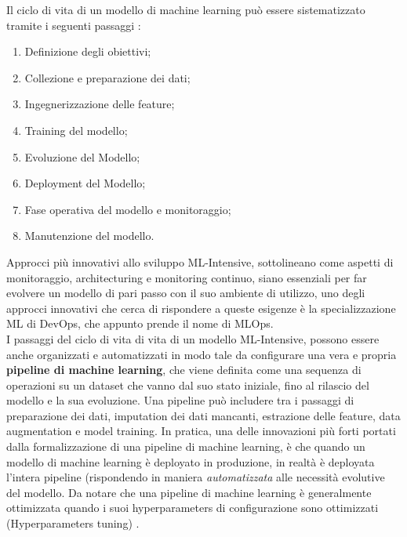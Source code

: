 Il ciclo di vita di un modello di machine learning può essere sistematizzato tramite i seguenti passaggi \cite{burkov2020machine}:

\begin{enumerate}
    \item Definizione degli obiettivi;
    \item Collezione e preparazione dei dati;
    \item Ingegnerizzazione delle feature;
    \item Training del modello;
    \item Evoluzione del Modello;
    \item Deployment del Modello;
    \item Fase operativa del modello e monitoraggio;
    \item Manutenzione del modello.
\end{enumerate}

Approcci più innovativi allo sviluppo ML-Intensive, sottolineano come aspetti di monitoraggio, architecturing e monitoring continuo, siano essenziali per far evolvere un modello di pari passo con il suo ambiente di utilizzo, uno degli approcci innovativi che cerca di rispondere a queste esigenze è la specializzazione ML di DevOps, che appunto prende il nome di MLOps.\\

I passaggi del ciclo di vita di vita di un modello ML-Intensive, possono essere anche organizzati e automatizzati in modo tale da configurare una vera e propria \textbf{pipeline di machine learning}, che viene definita come una sequenza di operazioni su un dataset che vanno dal suo stato iniziale, fino al rilascio del modello e la sua evoluzione. Una pipeline può includere tra i passaggi di preparazione dei dati, imputation dei dati mancanti, estrazione delle feature, data augmentation e model training\cite{burkov2020machine}. In pratica, una delle innovazioni più forti portati dalla formalizzazione di una pipeline di machine learning, è che quando un modello di machine learning è deployato in produzione, in realtà è deployata l'intera pipeline\cite{burkov2020machine} (rispondendo in maniera \emph{automatizzata} alle necessità evolutive del modello. Da notare che una pipeline di machine learning è generalmente ottimizzata quando i suoi hyperparameters di configurazione sono ottimizzati (Hyperparameters tuning) \cite{burkov2020machine}.
\newpage